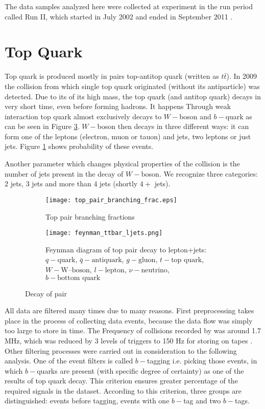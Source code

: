 The data samples analyzed here were collected at \dzero experiment in the run period called Run II, which started in July 2002 and ended in September 2011 \cite{Yuntse}.

\section{Top Quark}
Top quark is produced mostly in pairs top-antitop quark (written as $t\bar{t}$). In 2009 the collision from which single top quark originated  (without its antiparticle) was detected. Due to its of its high mass, the top quark (and antitop quark) decays in very short time, even before forming hadrons. It happens Through weak interaction top quark almost exclusively decays to $W-$boson and $b-$quark as can be seen in Figure \ref{fig:feynman-ljets}. $W-$boson then decays in three different ways: it can form one of the leptons (electron, muon or tauon) and jets, two leptons or just jets. Figure \ref{fig:ttbarBranchingFrac} shows probability of these events. 

Another parameter which changes physical properties of the collision is the number of jets present in the decay of $W-$boson. We recognize three categories: $2$ jets, $3$ jets and more than $4$ jets (shortly $4+$ jets).

\begin{figure}[h]
  \centering
  \begin{subfigure}{.55	\textwidth}\centering
    \texttt{[image: top\_pair\_branching\_frac.eps]}
    \caption{Top pair branching fractions}
    \label{fig:ttbarBranchingFrac}
  \end{subfigure}\hspace{3mm}
  \begin{subfigure}{.4\textwidth}\centering
    \texttt{[image: feynman\_ttbar\_ljets.png]}
    \caption{Feynman diagram of top pair decay to lepton+jets: 
    $q - \text{quark}$,
    $\bar{q} - \text{antiquark}$,
	$g - \text{gluon}$,
	$t - \text{top quark}$,
    $W - \text{W--boson}$,
    $l - \text{lepton}$,
    $\nu - \text{neutrino}$,
    $b - \text{bottom quark}$ \cite{Heinson}}
   	\label{fig:feynman-ljets}
  \end{subfigure}
  \caption{Decay of \ttbar pair}
\end{figure} 

All data are filtered many times due to many reasons. First preprocessing takes  place in the process of collecting data events, because the data flow was simply too large to store in time. The Frequency of collisions recorded by \dzero was around 1.7 MHz, which was reduced by 3 levels of triggers to 150 Hz for storing on tapes \cite{Yuntse}. Other filtering processes were carried out in consideration to the following analysis. One of the event filters is called $b-$tagging i.e. picking those events, in which $b-$quarks are present (with specific degree of certainty) as one of the results of top quark decay. This criterion ensures greater percentage of the required signals in the dataset. According to this criterion, three groups are distinguished: events before tagging, events with one $b-$tag and two $b-$tags.

